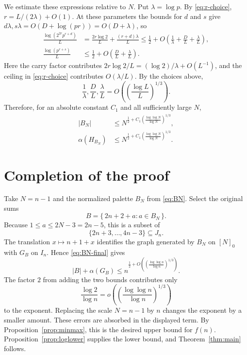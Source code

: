 \documentclass[11pt]{article}
\numberwithin{equation}{section}
\theoremstyle{definition}
\theoremstyle{remark}
\begin{document}
We estimate these expressions relative to $N$.  Put $\lambda=\log p$.
By \eqref{eq:r-choice}, $r=L/(2\lambda)+O(1)$.  At these parameters the
bounds for $d$ and $s$ give
$d\lambda,s\lambda=O(D+\log(pr))=O(D+\lambda)$, so
\begin{align*}
 \frac{\log(2^{2r}p^{r+d})}{L}
 &=\frac{2r\log 2}{L}+\frac{(r+d)\lambda}{L}
  \le\frac12+O\left(\frac1\lambda+\frac DL+\frac\lambda L\right),\\
 \frac{\log(p^{r+s})}{L}
 &\le\frac12+O\left(\frac DL+\frac\lambda L\right).
\end{align*}
Here the carry factor contributes
$2r\log2/L=(\log2)/\lambda+O(L^{-1})$, and the ceiling in
\eqref{eq:r-choice} contributes $O(\lambda/L)$.  By the choices above,
\[
 \frac1\lambda,\frac DL,\frac\lambda L
 =O\left(\left(\frac{\log L}{L}\right)^{1/3}\right).
\]
Therefore, for an absolute constant $C_1$ and all sufficiently large $N$,
\begin{equation}\label{eq:BN-final}
 \begin{aligned}
 |B_N|&\le N^{\frac12+C_1
   \left(\frac{\log\log N}{\log N}\right)^{1/3}},\\
 \alpha(H_{B_N})&\le N^{\frac12+C_1
   \left(\frac{\log\log N}{\log N}\right)^{1/3}}.
 \end{aligned}
\end{equation}

\section{Completion of the proof}\label{sec:completion}

Take $N=n-1$ and the normalized palette $B_N$ from
\eqref{eq:BN}.  Select the original sums
\[
 B=\{\,2n+2+a:a\in B_N\,\}.
\]
Because $1\le a\le2N-3=2n-5$, this is a subset of
\[
 \{2n+3,\ldots,4n-3\}\subseteq J_n.
\]
The translation $x\mapsto n+1+x$ identifies the graph generated by $B_N$
on $[N]_0$ with $G_B$ on $I_n$.  Hence \eqref{eq:BN-final} gives
\[
 |B|+\alpha(G_B)
 \le n^{\frac12+O\!\left(
   \left(\frac{\log\log n}{\log n}\right)^{1/3}\right)}.
\]
The factor $2$ from adding the two bounds contributes only
\[
 \frac{\log2}{\log n}
 =o\left(\left(\frac{\log\log n}{\log n}\right)^{1/3}\right)
\]
to the exponent.  Replacing the scale $N=n-1$ by $n$ changes the exponent
by a smaller amount.  These errors are absorbed in the displayed term.
By Proposition~\ref{prop:minmax}, this is the desired upper bound for
$f(n)$.  Proposition~\ref{prop:loglower} supplies the lower bound, and
Theorem~\ref{thm:main} follows.
\end{document}
